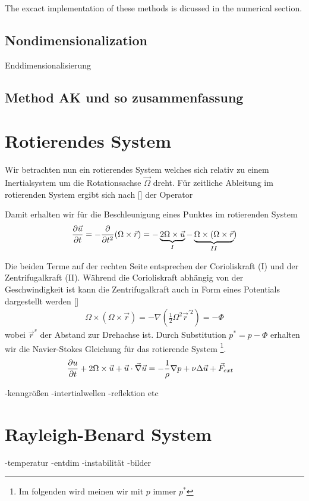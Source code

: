 The excact implementation of these methods is dicussed in the numerical section.

\subsection{Nondimensionalization}

Enddimensionalisierung

\subsection{Method AK  und so zusammenfassung}


\section{Rotierendes System}
Wir betrachten nun ein rotierendes System welches  sich relativ zu einem Inertialsystem um die Rotationsachse $\vec{\Omega}$ dreht.
Für zeitliche Ableitung im rotierenden System ergibt sich nach [] der Operator


\iffalse
\begin{align}
    \left\pdn{t} \right|_{Inertial} &= \left\pdn[]{\vec{t}}\right|_{Rotated} + \Omega \times
\end{align}
\fi
Damit erhalten wir für die Beschleunigung eines Punktes im rotierenden System
\begin{align}
    \pdn[\vec{u}]{t} = -\pdn[]{t^2}(\Omega \times \vec{r}) = -\underbrace{2\Omega \times \vec{u}}_{I} - \underbrace{\Omega \times (\Omega \times \vec{r}}_{II})
\end{align}

Die beiden Terme auf der rechten Seite entsprechen der Corioliskraft (I) und der Zentrifugalkraft (II). Während die Corioliskraft abhängig von der Geschwindigkeit ist
kann die Zentrifugalkraft auch in Form eines Potentials dargestellt werden []
\begin{align}
    \Omega \times (\Omega \times \vec{r}) = - \nabla(\frac{1}{2}\Omega^2\vec{r}^{'2}) = -\Phi
\end{align}
wobei $\vec{r}^s$ der Abstand zur Drehachse ist. Durch Substitution $p^* = p - \Phi$
erhalten wir die Navier-Stokes Gleichung für das rotierende System \footnote{Im folgenden wird meinen wir mit $p$ immer $p^*$ }.
\begin{align}
    \pdn[u]{t} + 2\Omega \times \vec{u} +  \vec{u} \cdot \vec{\nabla} \vec{u} &= - \frac{1}{\rho} \nabla p + \nu \Delta \vec{u} + \vec{F}_{ext}
\end{align}

-kenngrößen
-intertialwellen
-reflektion etc

\section{Rayleigh-Benard System}
-temperatur
-entdim
-instabilität
-bilder





